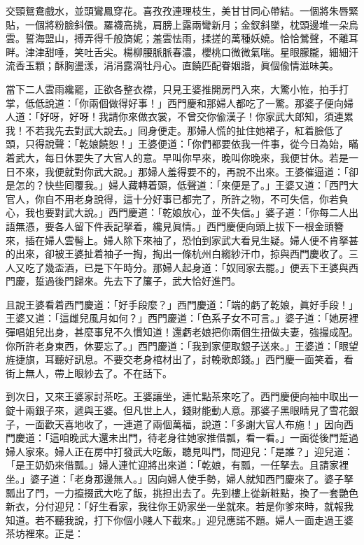 \begin{myquote} 
交頸鴛鴦戲水，並頭鸞鳳穿花。喜孜孜連理枝生，美甘甘同心帶結。一個將朱唇緊貼，一個將粉臉斜偎。羅襪高挑，肩膀上露兩彎新月；金釵斜墜，枕頭邊堆一朵烏雲。{}誓海盟山，搏弄得千般旖妮；羞雲怯雨，揉搓的萬種妖嬈。恰恰鶯聲，不離耳畔。津津甜唾，笑吐舌尖。楊柳腰脈脈春濃，櫻桃口微微氣喘。星眼朦朧，細細汗流香玉顆；酥胸盪漾，涓涓露滴牡丹心。直饒匹配眷姻諧，眞個偸情滋味美。
\end{myquote} 

當下二人雲雨纔罷，正欲各整衣襟，只見王婆推開房門入來，大驚小恠，拍手打掌，低低說道：{}「你兩個做得好事！」西門慶和那婦人都吃了一驚。那婆子便向婦人道：「好呀，好呀！我請你來做衣裳，不曾交你偸漢子！{}你家武大郎知，須連累我！不若我先去對武大說去。」囘身便走。那婦人慌的扯住她裙子，紅着臉低了頭，只得說聲：「乾娘饒恕！」{}王婆便道：「你們都要依我一件事，從今日為始，瞞着武大，每日休要失了大官人的意。早叫你早來，晚叫你晚來，我便甘休。若是一日不來，我便就對你武大說。」那婦人羞得要不的，再說不出來。王婆催逼道：「卻是怎的？快些囘覆我。」婦人藏轉着頭，低聲道：「來便是了。」王婆又道：「西門大官人，你自不用老身說得，這十分好事已都完了，所許之物，不可失信，{}你若負心，我也要對武大說。」西門慶道：「乾娘放心，並不失信。」婆子道：「你每二人出語無憑，要各人留下件表記拏着，纔見眞情。」西門慶便向頭上拔下一根金頭簪來，插在婦人雲髻上。婦人除下來袖了，恐怕到家武大看見生疑。婦人便不肯拏甚的出來，卻被王婆扯着袖子一掏，掏出一條杭州白縐紗汗巾，掠與西門慶收了。{}三人又吃了幾盃酒，已是下午時分。那婦人起身道：「奴囘家去罷。」便丟下王婆與西門慶，踅過後門歸來。先去下了簾子，武大恰好進門。

且說王婆看着西門慶道：「好手段麼？」西門慶道：「端的虧了乾娘，眞好手段！」王婆又道：「這雌兒風月如何？」西門慶道：「色系子女不可言。」婆子道：「她房裡彈唱姐兒出身，甚麼事兒不久慣知道！還虧老娘把你兩個生扭做夫妻，強撮成配。你所許老身東西，休要忘了。」西門慶道：「我到家便取銀子送來。」王婆道：「眼望旌捷旗，耳聽好訊息。不要交老身棺材出了，討輓歌郎錢。」{}西門慶一面笑着，看街上無人，帶上眼紗去了。不在話下。

到次日，又來王婆家討茶吃。王婆讓坐，連忙點茶來吃了。西門慶便向袖中取出一錠十兩銀子來，遞與王婆。但凡世上人，錢財能動人意。那婆子黑眼睛見了雪花銀子，一面歡天喜地收了，一連道了兩個萬福，說道：「多謝大官人布施！」{}因向西門慶道：「這咱晚武大還未出門，待老身往她家推借瓢，看一看。」一面從後門踅過婦人家來。婦人正在房中打發武大吃飯，聽見叫門，問迎兒：「是誰？」迎兒道：「是王奶奶來借瓢。」婦人連忙迎將出來道：「乾娘，有瓢，一任拏去。且請家裡坐。」婆子道：「老身那邊無人。」因向婦人使手勢，婦人就知西門慶來了。{}婆子拏瓢出了門，一力攛掇武大吃了飯，挑担出去了。先到樓上從新粧點，換了一套艷色新衣，分付迎兒：「好生看家，我往你王奶家坐一坐就來。若是你爹來時，就報我知道。若不聽我說，打下你個小賤人下截來。」迎兒應諾不題。婦人一面走過王婆茶坊裡來。正是：

